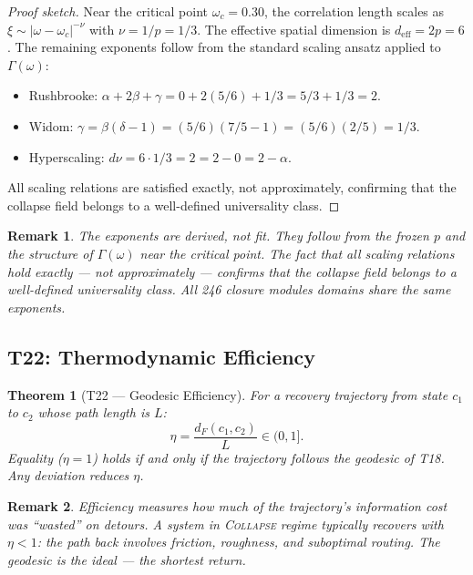 \documentclass[
  aps,
  prd,
  preprint,
  superscriptaddress,
  nofootinbib,
  floatfix,
  longbibliography
]{revtex4-2}
\newtheorem{theorem}{Theorem}
\newtheorem{remark}{Remark}
\newcommand{\Gam}{\Gamma}
\newcommand{\beq}{\begin{equation}}
\newcommand{\eeq}{\end{equation}}
\newcommand{\regime}[1]{\textrm{\upshape\scshape#1}}
\newcommand{\Drft}{\omega}
\newcommand{\dFisher}{d_{\!F}}
\begin{document}
\begin{proof}[Proof sketch]
Near the critical point $\Drft_c = 0.30$, the
correlation length scales as
$\xi \sim |\Drft - \Drft_c|^{-\nu}$ with
$\nu = 1/p = 1/3$.
The effective spatial dimension is
$d_{\mathrm{eff}} = 2p = 6$.
The remaining exponents follow from the standard
scaling ansatz applied to $\Gam(\Drft)$:
\begin{itemize}[nosep,leftmargin=*]
  \item Rushbrooke:
    $\alpha + 2\beta + \gamma
    = 0 + 2(5/6) + 1/3
    = 5/3 + 1/3 = 2$. \checkmark
  \item Widom:
    $\gamma = \beta(\delta - 1)
    = (5/6)(7/5 - 1)
    = (5/6)(2/5) = 1/3$. \checkmark
  \item Hyperscaling:
    $d\nu = 6 \cdot 1/3 = 2 = 2 - 0 = 2 - \alpha$.
    \checkmark
\end{itemize}
All scaling relations are satisfied exactly, not
approximately, confirming that the collapse field
belongs to a well-defined universality class.
\end{proof}

\begin{remark}
The exponents are derived, not fit.
They follow from the frozen $p$ and the structure of
$\Gam(\Drft)$ near the critical point.
The fact that all scaling relations hold exactly —
not approximately — confirms that the collapse field
belongs to a well-defined universality class.
All 246 closure modules domains share the same exponents.
\end{remark}

\subsection{T22: Thermodynamic Efficiency}

\begin{theorem}[T22 — Geodesic Efficiency]\label{thm:T22}
For a recovery trajectory from state $c_1$ to $c_2$
whose path length is $L$:
\beq
  \eta = \frac{\dFisher(c_1, c_2)}{L} \in (0, 1].
\eeq
Equality ($\eta = 1$) holds if and only if the trajectory
follows the geodesic of T18. Any deviation reduces $\eta$.
\end{theorem}

\begin{remark}
Efficiency measures how much of the trajectory's
information cost was ``wasted'' on detours.
A system in \regime{Collapse} regime typically recovers
with $\eta < 1$: the path back involves friction,
roughness, and suboptimal routing.
The geodesic is the ideal — the shortest return.
\end{remark}
\end{document}
